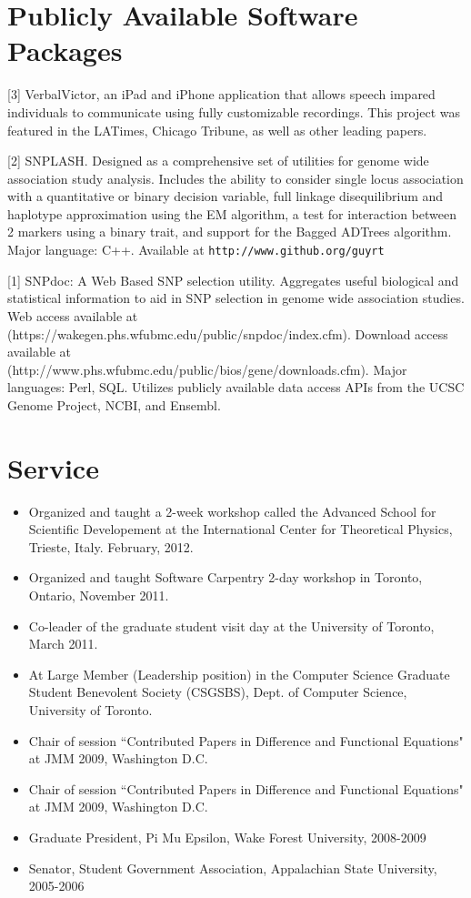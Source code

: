 \documentclass[overlapped,line,letterpaper]{res}
\begin{document}
\begin{resume}
\section{\bf Publicly Available Software Packages}

[3] VerbalVictor, an iPad and iPhone application that allows speech impared individuals to communicate using fully customizable recordings.  This project was featured in the LATimes, Chicago Tribune, as well as other leading papers.

[2] SNPLASH.  Designed as a comprehensive set of utilities for genome wide association study analysis.  Includes the ability to consider single locus association with a quantitative or binary decision variable, full linkage disequilibrium and haplotype approximation using the EM algorithm, a test for interaction between 2 markers using a binary trait, and support for the Bagged ADTrees algorithm.  Major language: C++. Available at \tt{http://www.github.org/guyrt} 

[1] SNPdoc: A Web Based SNP selection utility.  Aggregates useful biological and statistical information to aid in SNP selection in genome wide association studies.  Web access available at (https://wakegen.phs.wfubmc.edu/public/snpdoc/index.cfm).  Download access available at \\ (http://www.phs.wfubmc.edu/public/bios/gene/downloads.cfm).  Major languages: Perl, SQL. Utilizes publicly available data access APIs from the UCSC Genome Project, NCBI, and Ensembl.

\section{\bf Service}

\begin{itemize}
\item Organized and taught a 2-week workshop called the Advanced School for Scientific Developement at the International Center for Theoretical Physics, Trieste, Italy. February, 2012.
\item Organized and taught Software Carpentry 2-day workshop in Toronto, Ontario, November 2011.
\item Co-leader of the graduate student visit day at the University of Toronto, March 2011. 
\item At Large Member (Leadership position) in the Computer Science Graduate Student Benevolent Society (CSGSBS), Dept. of Computer Science, University of Toronto.
\item Chair of session ``Contributed Papers in Difference and Functional Equations" at JMM 2009, Washington D.C.
\item Chair of session ``Contributed Papers in Difference and Functional Equations" at JMM 2009, Washington D.C.
\item Graduate President, Pi Mu Epsilon, Wake Forest University, 2008-2009
\item Senator, Student Government Association, Appalachian State University, 2005-2006
\end{itemize}


\end{resume}
\end{document}
